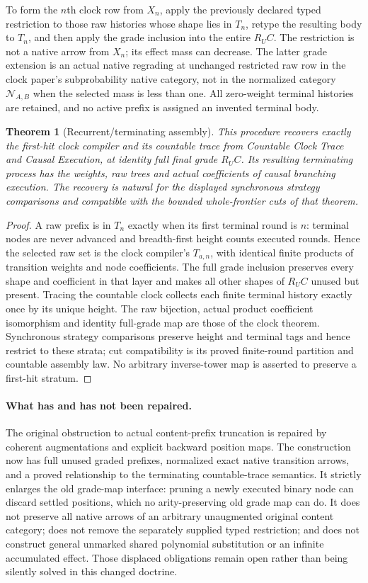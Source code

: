 \documentclass[11pt]{article}
\newtheorem{theorem}{Theorem}\newtheorem{proposition}[theorem]{Proposition}
\begin{document}
To form the $n$th clock row from $X_n$, apply the previously declared typed restriction to those raw histories whose shape lies in $T_n$, retype the resulting body to $T_n$, and then apply the grade inclusion into the entire $R_UC$. The restriction is not a native arrow from $X_n$; its effect mass can decrease. The latter grade extension is an actual native regrading at unchanged restricted raw row in the clock paper's subprobability native category, not in the normalized category $\mathcal N_{A,B}$ when the selected mass is less than one. All zero-weight terminal histories are retained, and no active prefix is assigned an invented terminal body.

\begin{theorem}[Recurrent/terminating assembly]
This procedure recovers exactly the first-hit clock compiler and its countable trace from \emph{Countable Clock Trace and Causal Execution}, at identity full final grade $R_UC$. Its resulting terminating process has the weights, raw trees and actual coefficients of causal branching execution. The recovery is natural for the displayed synchronous strategy comparisons and compatible with the bounded whole-frontier cuts of that theorem.
\end{theorem}
\begin{proof}
A raw prefix is in $T_n$ exactly when its first terminal round is $n$: terminal nodes are never advanced and breadth-first height counts executed rounds. Hence the selected raw set is the clock compiler's $T_{a,n}$, with identical finite products of transition weights and node coefficients. The full grade inclusion preserves every shape and coefficient in that layer and makes all other shapes of $R_UC$ unused but present. Tracing the countable clock collects each finite terminal history exactly once by its unique height. The raw bijection, actual product coefficient isomorphism and identity full-grade map are those of the clock theorem. Synchronous strategy comparisons preserve height and terminal tags and hence restrict to these strata; cut compatibility is its proved finite-round partition and countable assembly law. No arbitrary inverse-tower map is asserted to preserve a first-hit stratum.
\end{proof}

\paragraph{What has and has not been repaired.}
The original obstruction to actual content-prefix truncation is repaired by coherent augmentations and explicit backward position maps. The construction now has full unused graded prefixes, normalized exact native transition arrows, and a proved relationship to the terminating countable-trace semantics. It strictly enlarges the old grade-map interface: pruning a newly executed binary node can discard settled positions, which no arity-preserving old grade map can do. It does not preserve all native arrows of an arbitrary unaugmented original content category; does not remove the separately supplied typed restriction; and does not construct general unmarked shared polynomial substitution or an infinite accumulated effect. Those displaced obligations remain open rather than being silently solved in this changed doctrine.
\end{document}
